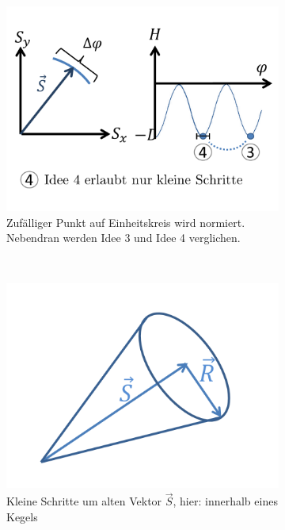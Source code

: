 \documentclass[12pt]{article}
\begin{document}
\begin{enumerate}
\begin{figure}[h] 
		\begin{subfigure}[h]{0.5 \textwidth}
		\centering
		\includegraphics[width=\textwidth]{Folie47.png}
		\caption{Zufälliger Punkt auf Einheitskreis wird normiert. Nebendran werden Idee 3 und Idee 4 verglichen.} 
		\label{fig:zufaellig}
		\centering
	\end{subfigure}
	~
\begin{subfigure}[h]{0.5\textwidth}
		\centering
		\includegraphics[width=\textwidth]{Folie48.png}
		\caption{Kleine Schritte um alten Vektor $\vec{S}$, hier: innerhalb eines Kegels}
		\label{fig:Kegel}
		\centering
	\end{subfigure}
	\caption{} %
\end{figure}	



\end{enumerate}
\end{document}
